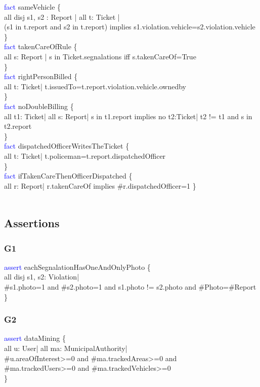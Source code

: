 \textcolor{blue}{fact}
\textcolor{mycolor}{sameVehicle} \{\\
all disj s1, s2 : Report | all t: Ticket |\\
(s1 in t.report and s2 in t.report) implies s1.violation.vehicle=s2.violation.vehicle\\
\}\\
\textcolor{blue}{fact}
\textcolor{mycolor}{takenCareOfRule} \{\\
all s: Report |
s in Ticket.segnalations iff s.takenCareOf=True\\
\}\\
\textcolor{blue}{fact}
\textcolor{mycolor}{rightPersonBilled} \{\\
all t: Ticket| t.issuedTo=t.report.violation.vehicle.ownedby\\
\}\\
\textcolor{blue}{fact}
\textcolor{mycolor}{noDoubleBilling} \{\\
all t1: Ticket| all s: Report|
s in t1.report implies no t2:Ticket| t2 != t1 and s in t2.report\\
\}\\
\textcolor{blue}{fact}
\textcolor{mycolor}{dispatchedOfficerWritesTheTicket} \{\\
all t: Ticket| t.policeman=t.report.dispatchedOfficer\\
\}\\
\textcolor{blue}{fact}
\textcolor{mycolor}{ifTakenCareThenOfficerDispatched} \{\\
all r: Report| r.takenCareOf implies \#r.dispatchedOfficer=1 
\}\\
\\
\subsection{Assertions}
\subsubsection{G1}
\textcolor{blue}{assert}
\textcolor{mycolor}{eachSegnalationHasOneAndOnlyPhoto} \{\\
all disj s1, s2: Violation|\\ 
\#s1.photo=1 and \#s2.photo=1 and s1.photo != s2.photo
and \#Photo=\#Report\\
\}\\
\subsubsection{G2}
\textcolor{blue}{assert}
\textcolor{mycolor}{dataMining} \{\\
all u: User| all ma: MunicipalAuthority|\\
\#u.areaOfInterest>=0 and \#ma.trackedAreas>=0 and\\ \#ma.trackedUsers>=0 and \#ma.trackedVehicles>=0\\
\}\\

